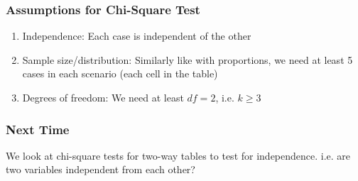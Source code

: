 \documentclass[handout]{beamer}
\newcommand{\blue}[1]{\textcolor{blue2}{#1}}
\begin{document}
\begin{frame}[fragile]
\frametitle{Assumptions for Chi-Square Test}
\begin{enumerate}
\pause \item \blue{Independence}:  Each case is independent of the other
\pause\item \blue{Sample size/distribution}:  Similarly like with proportions, we need at least 5 cases in each scenario (each cell in the table)
\pause\item \blue{Degrees of freedom}:  We need at least $df=2$, i.e. $k\geq 3$
\end{enumerate}

\end{frame}


\begin{frame}[fragile]
\frametitle{Next Time}
We look at \blue{chi-square tests for two-way tables} to test for \blue{independence}.  i.e. are two variables independent from each other?

\end{frame}
\end{document}
